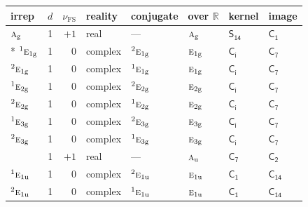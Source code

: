 \documentclass[10pt,a4paper]{article}
\numberwithin{equation}{section}
\newcommand{\grp}[1]{\mathsf{#1}}
\newcommand{\irr}[1]{\text{\normalfont\scshape #1}}
\newcommand{\conjpair}[1]{{}^{#1}}
\newcommand{\detbox}[1]{{\setlength{\fboxsep}{1pt}\fbox{#1}}}
\newcommand{\ptag}[1]{\mathrm{#1}}
\newcommand{\fsind}{\nu_{\mathrm{FS}}}
\begin{document}
{\small\renewcommand{\arraystretch}{1.25}\setlength{\tabcolsep}{4pt}\begin{longtable}{@{}lrrlllll@{}}\toprule
irrep & $d$ & $\fsind$ & reality & conjugate & over $\mathbb{R}$ & kernel & image\\\midrule\endhead
\bottomrule\endfoot\endlastfoot
$\irr{a}_{\ptag{g}}$ & 1 & $+1$ & real & --- & $\irr{a}_{\ptag{g}}$ & \href{S14.pdf}{$\grp{S_{14}}$} & \href{../../../rotation/data/pdf/C1.pdf}{$\grp{C_{1}}$}\\*
$\conjpair{1}\irr{e}_{1\ptag{g}}$ & 1 & $0$ & complex & $\conjpair{2}\irr{e}_{1\ptag{g}}$ & $\irr{e}_{1\ptag{g}}$ & \href{S2.pdf}{$\grp{C_{i}}$} & \href{../../../rotation/data/pdf/C7.pdf}{$\grp{C_{7}}$}\\
$\conjpair{2}\irr{e}_{1\ptag{g}}$ & 1 & $0$ & complex & $\conjpair{1}\irr{e}_{1\ptag{g}}$ & $\irr{e}_{1\ptag{g}}$ & \href{S2.pdf}{$\grp{C_{i}}$} & \href{../../../rotation/data/pdf/C7.pdf}{$\grp{C_{7}}$}\\
$\conjpair{1}\irr{e}_{2\ptag{g}}$ & 1 & $0$ & complex & $\conjpair{2}\irr{e}_{2\ptag{g}}$ & $\irr{e}_{2\ptag{g}}$ & \href{S2.pdf}{$\grp{C_{i}}$} & \href{../../../rotation/data/pdf/C7.pdf}{$\grp{C_{7}}$}\\
$\conjpair{2}\irr{e}_{2\ptag{g}}$ & 1 & $0$ & complex & $\conjpair{1}\irr{e}_{2\ptag{g}}$ & $\irr{e}_{2\ptag{g}}$ & \href{S2.pdf}{$\grp{C_{i}}$} & \href{../../../rotation/data/pdf/C7.pdf}{$\grp{C_{7}}$}\\
$\conjpair{1}\irr{e}_{3\ptag{g}}$ & 1 & $0$ & complex & $\conjpair{2}\irr{e}_{3\ptag{g}}$ & $\irr{e}_{3\ptag{g}}$ & \href{S2.pdf}{$\grp{C_{i}}$} & \href{../../../rotation/data/pdf/C7.pdf}{$\grp{C_{7}}$}\\
$\conjpair{2}\irr{e}_{3\ptag{g}}$ & 1 & $0$ & complex & $\conjpair{1}\irr{e}_{3\ptag{g}}$ & $\irr{e}_{3\ptag{g}}$ & \href{S2.pdf}{$\grp{C_{i}}$} & \href{../../../rotation/data/pdf/C7.pdf}{$\grp{C_{7}}$}\\
\detbox{$\irr{a}_{\ptag{u}}$} & 1 & $+1$ & real & --- & $\irr{a}_{\ptag{u}}$ & \href{C7.pdf}{$\grp{C_{7}}$} & \href{../../../rotation/data/pdf/C2.pdf}{$\grp{C_{2}}$}\\
$\conjpair{1}\irr{e}_{1\ptag{u}}$ & 1 & $0$ & complex & $\conjpair{2}\irr{e}_{1\ptag{u}}$ & $\irr{e}_{1\ptag{u}}$ & \href{C1.pdf}{$\grp{C_{1}}$} & $\grp{C_{14}}$\\
$\conjpair{2}\irr{e}_{1\ptag{u}}$ & 1 & $0$ & complex & $\conjpair{1}\irr{e}_{1\ptag{u}}$ & $\irr{e}_{1\ptag{u}}$ & \href{C1.pdf}{$\grp{C_{1}}$} & $\grp{C_{14}}$\\

\end{longtable}}
\end{document}
